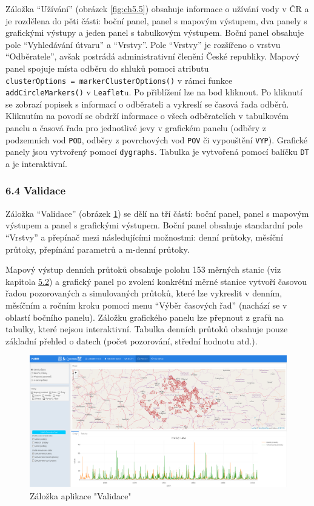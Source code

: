\documentclass[12pt,]{article}
\begin{document}
\qquad Záložka \enquote{Užívání} (obrázek \ref{fig:ch5.5}) obsahuje
informace o užívání vody v ČR a je rozdělena do pěti části: boční panel,
panel s mapovým výstupem, dva panely s grafickými výstupy a jeden panel
s tabulkovým výstupem. Boční panel obsahuje pole \enquote{Vyhledávání
útvaru} a \enquote{Vrstvy}. Pole \enquote{Vrstvy} je rozšířeno o vrstvu
\enquote{Odběratele}, avšak postrádá administrativní členění České
republiky. Mapový panel spojuje místa odběru do shluků pomoci atributu
\texttt{clusterOptions\ =\ markerClusterOptions()} v rámci funkce
\texttt{addCircleMarkers()} v \texttt{Leaflet}u. Po přiblížení lze na
bod kliknout. Po kliknutí se zobrazí popisek s informací o odběrateli a
vykreslí se časová řada odběrů. Kliknutím na povodí se obdrží informace
o všech odběratelích v tabulkovém panelu a časová řada pro jednotlivé
jevy v grafickém panelu (odběry z podzemních vod \texttt{POD}, odběry z
povrchových vod \texttt{POV} či vypouštění \texttt{VYP}). Grafické
panely jsou vytvořený pomocí \texttt{dygraphs}. Tabulka je vytvořená
pomocí balíčku \texttt{DT} a je interaktivní.

\subsubsection{6.4 Validace}\label{validace}

\qquad Záložka \enquote{Validace} (obrázek \ref{fig:ch5.6}) se dělí na
tří částí: boční panel, panel s mapovým výstupem a panel s grafickými
výstupem. Boční panel obsahuje standardní pole \enquote{Vrstvy} a
přepínač mezi následujícími možnostmi: denní průtoky, měsíční průtoky,
přepínání parametrů a m-denní průtoky.

\qquad Mapový výstup denních průtoků obsahuje polohu 153 měrných stanic
(viz kapitola \protect\hyperlink{data}{5.2}) a grafický panel po zvolení
konkrétní měrné stanice vytvoří časovou řadou pozorovaných a
simulovaných průtoků, které lze vykreslit v denním, měsíčním a ročním
kroku pomocí menu \enquote{Výběr časových řad} (nachází se v oblastí
bočního panelu). Záložku grafického panelu lze přepnout z grafů na
tabulky, které nejsou interaktivní. Tabulka denních průtoků obsahuje
pouze základní přehled o datech (počet pozorování, střední hodnotu
atd.).

\begin{figure}[H]
      \includegraphics[width=\textwidth]{fig/P_validace}
      \caption{Záložka aplikace "Validace"}
      \label{fig:ch5.6}
\end{figure}
\end{document}
